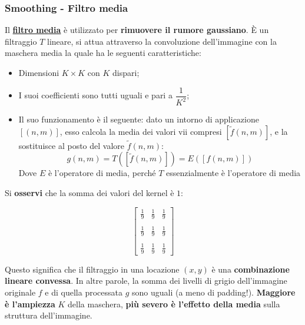 \documentclass[a4paper]{article}
\begin{document}
	\newpage

	\subsubsection{Smoothing - Filtro media}
	
	Il \textcolor{Red3}{\textbf{\underline{filtro media}}} è utilizzato per \textbf{rimuovere il rumore gaussiano}. È un filtraggio $T$ lineare, si attua attraverso la convoluzione dell'immagine con la maschera media la quale ha le seguenti caratteristiche:
	
	\begin{itemize}[label=-]
		\item Dimensioni $K \times K$ con $K$ dispari;
		\item I suoi coefficienti sono tutti uguali e pari a $\dfrac{1}{K^{2}}$;
		\item Il suo funzionamento è il seguente: dato un intorno di applicazione $\left[\left(n,m\right)\right]$, esso calcola la media dei valori vii compresi $\left[\tilde{f}\left(n,m\right)\right]$, e la sostituisce al posto del valore $\tilde{f}\left(n,m\right)$:
		\begin{equation*}
			g\left(n,m\right) = T\left(\left[\tilde{f}\left(n,m\right)\right]\right) = E\left(\left[f\left(n,m\right)\right]\right)
		\end{equation*}
		Dove $E$ è l'operatore di media, perché $T$ essenzialmente è l'operatore di media
	\end{itemize}

	\noindent
	Si \textbf{osservi} che la somma dei valori del kernel è $1$:
	
	\begin{equation*}
		\begin{bmatrix}
			\frac{1}{9} & \frac{1}{9} & \frac{1}{9} \\
			&& \\
			\frac{1}{9} & \frac{1}{9} & \frac{1}{9} \\
			&& \\
			\frac{1}{9} & \frac{1}{9} & \frac{1}{9}
		\end{bmatrix}
	\end{equation*}

	\noindent
	Questo significa che il filtraggio in una locazione $\left(x,y\right)$ è una \textbf{combinazione lineare convessa}. In altre parole, la somma dei livelli di grigio dell'immagine originale $f$ e di quella processata $g$ sono uguali (a meno di padding!).\newline
	\textbf{Maggiore è l'ampiezza} $K$ della maschera, \textbf{più severo è l'effetto della media} sulla struttura dell'immagine.
	
\end{document}
